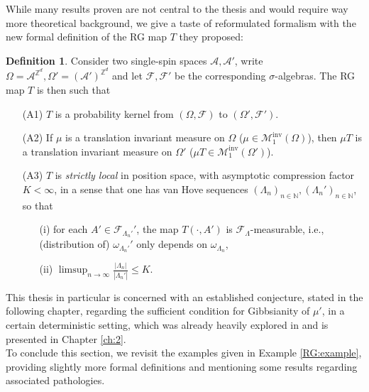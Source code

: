 \documentclass[12pt]{article}
\newcommand{\A}{\mathcal{A}}
\newcommand{\F}{\mathcal{F}}
\newcommand{\M}{\mathcal{M}}
\newcommand{\N}{\mathbb{N}}
\newcommand{\Z}{\mathbb{Z}}
\newcommand{\ra}{\rightarrow}
\newcommand{\pika}{\boldsymbol{\cdot}}
\newcommand{\1}{\mathbbm{1}}
\newcommand{\5}{\vspace{0.5cm}}
\theoremstyle{definition}
\newtheorem{df}[thm]{Definition}
\begin{document}
While many results proven are not central to the thesis and would require way more theoretical background, we give a taste of reformulated formalism with the new formal definition of the RG map $T$ they proposed:
\begin{df}
Consider two single-spin spaces $\A,\A'$, write $\Omega=\A^{\Z^d},\Omega'=(\A')^{\Z^{d}}$ and let $\F,\F'$ be the corresponding $\sigma$-algebras. The RG map $T$ is then such that 
\begin{itemize}
	\item[(A1)] $T$ is a probability kernel from $(\Omega,\F)$ to $(\Omega',\F')$.
	\item[(A2)] If $\mu$ is a translation invariant measure on $\Omega$ ($\mu\in\M_1^{\mathrm{inv}}(\Omega)$), then $\mu T$ is a translation invariant measure on $\Omega'$ ($\mu T\in\M_1^{\mathrm{inv}}(\Omega')$).
	\item[(A3)] $T$ is \textit{strictly local} in position space, with asymptotic compression factor $K<\infty$, in a sense that one has van Hove sequences $(\Lambda_n)_{n\in\N},(\Lambda_n')_{n\in\N}$, so that
	\begin{itemize}
		\item[(i)] for each $A'\in\F_{\Lambda_n'}'$, the map $T(\pika,A')$ is $\F_\Lambda$-measurable, i.e., (distribution of) $\omega_{\Lambda_n'}'$ only depends on $\omega_{\Lambda_n}$,
		\item[(ii)] $\limsup_{n\ra\infty}\frac{|\Lambda_n|}{|\Lambda_n'|}\leq K$.
	\end{itemize}
\end{itemize}
\end{df}

This thesis in particular is concerned with an established conjecture, stated in the following chapter, regarding the sufficient condition for Gibbsianity of $\mu'$, in a certain deterministic setting, which was already heavily explored in \cite{Ber} and is presented in Chapter \ref{ch:2}. \\

To conclude this section, we revisit the examples given in Example \ref{RG:example}, providing slightly more formal definitions and mentioning some results regarding associated pathologies.
\end{document}
